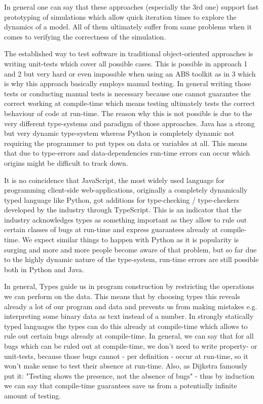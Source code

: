 In general one can say that these approaches (especially the 3rd one) support fast prototyping of simulations which allow quick iteration times to explore the dynamics of a model. All of them ultimately suffer from same problems when it comes to verifying the correctness of the simulation.

The established way to test software in traditional object-oriented approaches is writing unit-tests which cover all possible cases. This is possible in approach 1 and 2 but very hard or even impossible when using an ABS toolkit as in 3 which is why this approach basically employs manual testing. In general writing those tests or conducting manual tests is necessary because one cannot guarantee the correct working at compile-time which means testing ultimately tests the correct behaviour of code at run-time. The reason why this is not possible is due to the very different type-systems and paradigm of those approaches. Java has a strong but very dynamic type-system whereas Python is completely dynamic not requiring the programmer to put types on data or variables at all. This means that due to type-errors and data-dependencies run-time errors can occur which origins might be difficult to track down.

It is no coincidence that JavaScript, the most widely used language for programming client-side web-applications, originally a completely dynamically typed language like Python, got additions for type-checking / type-checkers developed by the industry through TypeScript. This is an indicator that the industry acknowledges types as something important as they allow to rule out certain classes of bugs at run-time and express guarantees already at compile-time. We expect similar things to happen with Python as it is popularity is surging and more and more people become aware of that problem, but so far due to the highly dynamic nature of the type-system, run-time errors are still possible both in Python and Java. 

In general, Types guide us in program construction by restricting the operations we can perform on the data. This means that by choosing types this reveals already a lot of our program and data and prevents us from making mistakes e.g. interpreting some binary data as text instead of a number. In strongly statically typed languages the types can do this already at compile-time which allows to rule out certain bugs already at compile-time. In general, we can say that for all bugs which can be ruled out at compile-time, we don't need to write property- or unit-tests, because those bugs cannot - per definition - occur at run-time, so it won't make sense to test their absence at run-time. Also, as Dijkstra famously put it: "Testing shows the presence, not the absence of bugs" - thus by induction we can say that compile-time guarantees save us from a potentially infinite amount of testing.

